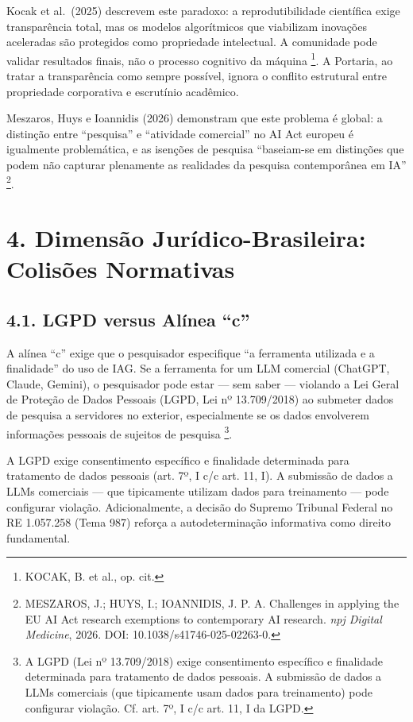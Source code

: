\documentclass[
  12pt,
  a4paper,
  brazil,
  twoside
]{report}
\begin{document}
Kocak et al.~(2025) descrevem este paradoxo: a reprodutibilidade
científica exige transparência total, mas os modelos algorítmicos que
viabilizam inovações aceleradas são protegidos como propriedade
intelectual. A comunidade pode validar resultados finais, não o processo
cognitivo da máquina \footnote{KOCAK, B. et al., op. cit.}. A Portaria,
ao tratar a transparência como sempre possível, ignora o conflito
estrutural entre propriedade corporativa e escrutínio acadêmico.

Meszaros, Huys e Ioannidis (2026) demonstram que este problema é global:
a distinção entre ``pesquisa'' e ``atividade comercial'' no AI Act
europeu é igualmente problemática, e as isenções de pesquisa
``baseiam-se em distinções que podem não capturar plenamente as
realidades da pesquisa contemporânea em IA'' \footnote{MESZAROS, J.;
  HUYS, I.; IOANNIDIS, J. P. A. Challenges in applying the EU AI Act
  research exemptions to contemporary AI research. \emph{npj Digital
  Medicine}, 2026. DOI: 10.1038/s41746-025-02263-0.}.

\section{4. Dimensão Jurídico-Brasileira: Colisões
Normativas}\label{dimensuxe3o-juruxeddico-brasileira-colisuxf5es-normativas}

\subsection{4.1. LGPD versus Alínea
``c''}\label{lgpd-versus-aluxednea-c}

A alínea ``c'' exige que o pesquisador especifique ``a ferramenta
utilizada e a finalidade'' do uso de IAG. Se a ferramenta for um LLM
comercial (ChatGPT, Claude, Gemini), o pesquisador pode estar --- sem
saber --- violando a Lei Geral de Proteção de Dados Pessoais (LGPD, Lei
nº 13.709/2018) ao submeter dados de pesquisa a servidores no exterior,
especialmente se os dados envolverem informações pessoais de sujeitos de
pesquisa \footnote{A LGPD (Lei nº 13.709/2018) exige consentimento
  específico e finalidade determinada para tratamento de dados pessoais.
  A submissão de dados a LLMs comerciais (que tipicamente usam dados
  para treinamento) pode configurar violação. Cf. art. 7º, I c/c art.
  11, I da LGPD.}.

A LGPD exige consentimento específico e finalidade determinada para
tratamento de dados pessoais (art. 7º, I c/c art. 11, I). A submissão de
dados a LLMs comerciais --- que tipicamente utilizam dados para
treinamento --- pode configurar violação. Adicionalmente, a decisão do
Supremo Tribunal Federal no RE 1.057.258 (Tema 987) reforça a
autodeterminação informativa como direito fundamental.
\end{document}

